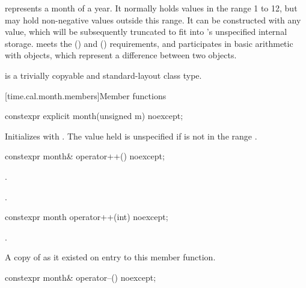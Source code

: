 \pnum
{} represents a month of a year.
It normally holds values in the range 1 to 12,
but may hold non-negative values outside this range.
It can be constructed with any  value,
which will be subsequently truncated to fit into 's unspecified internal storage.
 meets the  ()
and  () requirements,
and participates in basic arithmetic with  objects,
which represent a difference between two  objects.

\pnum
{} is a trivially copyable and standard-layout class type.

[time.cal.month.members]{Member functions}

%
\begin{itemdecl}
constexpr explicit month(unsigned m) noexcept;
\end{itemdecl}

\begin{itemdescr}
\pnum
\effects
Initializes  with .
The value held is unspecified if  is not in the range .
\end{itemdescr}

%
\begin{itemdecl}
constexpr month& operator++() noexcept;
\end{itemdecl}

\begin{itemdescr}
\pnum
\effects
{}.

\pnum
\returns
{}.
\end{itemdescr}

%
\begin{itemdecl}
constexpr month operator++(int) noexcept;
\end{itemdecl}

\begin{itemdescr}
\pnum
\effects
{}.

\pnum
\returns
A copy of  as it existed on entry to this member function.
\end{itemdescr}

%
\begin{itemdecl}
constexpr month& operator--() noexcept;
\end{itemdecl}

